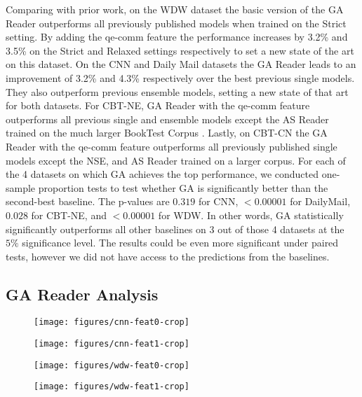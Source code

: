 \documentclass[11pt,a4paper]{article}
\begin{document}
Comparing with prior work, on the WDW dataset the basic version of the GA Reader outperforms all previously published models when trained on the Strict setting. By adding the qe-comm feature the performance increases by 3.2\% and 3.5\% on the Strict and Relaxed settings respectively to set a new state of the art on this dataset. On the CNN and Daily Mail datasets the GA Reader leads to an improvement of 3.2\% and 4.3\% respectively over the best previous single models. They also outperform previous ensemble models, setting a new state of that art for both datasets. For CBT-NE, GA Reader with the qe-comm feature outperforms all previous single and ensemble models except the AS Reader trained on the much larger BookTest Corpus \citep{bajgar2016embracing}. Lastly, on CBT-CN the GA Reader with the qe-comm feature outperforms all previously published single models except the NSE, and AS Reader trained on a larger corpus. For each of the 4 datasets on which GA achieves the top performance, we conducted one-sample proportion tests to test whether GA is significantly better than the second-best baseline. The p-values are $0.319$ for CNN, $<$$0.00001$ for DailyMail, $0.028$ for CBT-NE, and $<$$0.00001$ for WDW. In other words, GA statistically significantly outperforms all other baselines on 3 out of those 4 datasets at the $5\%$ significance level. The results could be even more significant under paired tests, however we did not have access to the predictions from the baselines.


\subsection{GA Reader Analysis}
\label{sec:ablation}
\begin{figure*}[ht]
    \centering
    \caption{Performance in accuracy with and without the Gated-Attention module over different training sizes. $p$-values for an exact one-sided Mcnemar's test are given inside the parentheses for each setting.}
    \begin{subfigure}[b]{0.245\textwidth}
    \texttt{[image: figures/cnn-feat0-crop]}
        \label{fig:cnn_wo_f}
    \end{subfigure}
    \begin{subfigure}[b]{0.245\textwidth}
        \texttt{[image: figures/cnn-feat1-crop]}
        \label{fig:cnn_w_f}
    \end{subfigure}
        \begin{subfigure}[b]{0.245\textwidth}
    \texttt{[image: figures/wdw-feat0-crop]}
        \label{fig:wdw_wo_f}
    \end{subfigure}
    \begin{subfigure}[b]{0.245\textwidth}
        \texttt{[image: figures/wdw-feat1-crop]}
        \label{fig:wdw_w_f}
    \end{subfigure}
    \label{fig:ablation}
\end{figure*}
\end{document}
